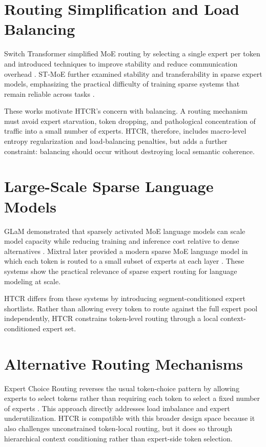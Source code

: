 \section{Routing Simplification and Load Balancing}

Switch Transformer simplified MoE routing by selecting a single expert per token and introduced techniques to improve stability and reduce communication overhead \cite{Fedus2022}. ST-MoE further examined stability and transferability in sparse expert models, emphasizing the practical difficulty of training sparse systems that remain reliable across tasks \cite{Zoph2022}.

These works motivate HTCR's concern with balancing. A routing mechanism must avoid expert starvation, token dropping, and pathological concentration of traffic into a small number of experts. HTCR, therefore, includes macro-level entropy regularization and load-balancing penalties, but adds a further constraint: balancing should occur without destroying local semantic coherence.

\section{Large-Scale Sparse Language Models}

GLaM demonstrated that sparsely activated MoE language models can scale model capacity while reducing training and inference cost relative to dense alternatives \cite{Du2022}. Mixtral later provided a modern sparse MoE language model in which each token is routed to a small subset of experts at each layer \cite{Jiang2024}. These systems show the practical relevance of sparse expert routing for language modeling at scale.

HTCR differs from these systems by introducing segment-conditioned expert shortlists. Rather than allowing every token to route against the full expert pool independently, HTCR constrains token-level routing through a local context-conditioned expert set.

\section{Alternative Routing Mechanisms}

Expert Choice Routing reverses the usual token-choice pattern by allowing experts to select tokens rather than requiring each token to select a fixed number of experts \cite{Zhou2022}. This approach directly addresses load imbalance and expert underutilization. HTCR is compatible with this broader design space because it also challenges unconstrained token-local routing, but it does so through hierarchical context conditioning rather than expert-side token selection.

